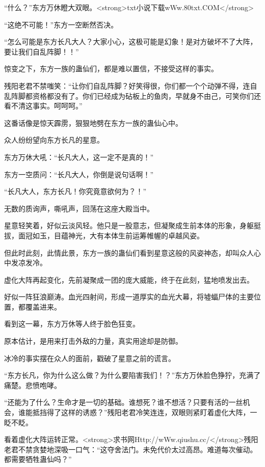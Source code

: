 
\begin{this_body}

“什么？”东方万休瞪大双眼。<strong>txt小说下载wWw.80txt.COM</strong>

“这绝不可能！”东方一空断然否决。

“怎么可能是东方长凡大人？大家小心，这极可能是幻象！是对方破坏不了大阵，要让我们自乱阵脚！！”

惊变之下，东方一族的蛊仙们，都是难以置信，不接受这样的事实。

残阳老君不禁嗤笑：“让你们自乱阵脚？好笑得很，你们都一个个动弹不得，连自乱阵脚都资格都没有了。你们已经成为砧板上的鱼肉，早就身不由己，可笑你们还看不清这事实。呵呵呵。”

这番话像是惊天霹雳，狠狠地劈在东方一族的蛊仙心中。

众人纷纷望向东方长凡的星意。

东方万休大吼：“长凡大人，这一定不是真的！”

东方一空质问：“长凡大人，你倒是说句话啊！”

“长凡大人，东方长凡！你究竟意欲何为？！”

无数的质询声，嘶吼声，回荡在这座大殿当中。

星意轻笑着，好似云淡风轻。他只是一股意志，但凝聚成生前本体的形象，身躯挺拔，面冠如玉，目蕴神光，大有本体生前运筹帷幄的卓越风姿。

但此时此刻，此情此景，东方一族的蛊仙们看到星意这般的风姿神态，却叫众人心中发凉发冷。

虚化大阵再起变化，先前凝聚成一团的庞大威能，终于在此刻，猛地喷发出去。

好似一阵狂浪巅涛。血光四射间，形成一道厚实的血光大幕，将墟蝠尸体的主要位置，都覆盖进来。

看到这一幕，东方万休等人终于脸色狂变。

原本估计，是用来打击外敌的力量，真实用途却是防御。

冰冷的事实摆在众人的面前，戳破了星意之前的谎言。

“东方长凡，你为什么这么做？为什么要陷害我们！？”东方万休脸色狰狞，充满了痛楚。悲愤咆哮。

“还能为了什么？生命才是一切的基础。谁想死？谁不想活？只要有活的一丝机会，谁能抵挡得了这样的诱惑？”残阳老君冷笑连连，双眼则紧盯着虚化大阵，一眨不眨。

看着虚化大阵运转正常。<strong>求书网Http://wWw.qiushu.cc/</strong>残阳老君不禁贪婪地深吸一口气：“这夺舍法门。未免代价太过高昂。难道每次催动。都需要牺牲蛊仙吗？”


\end{this_body}

